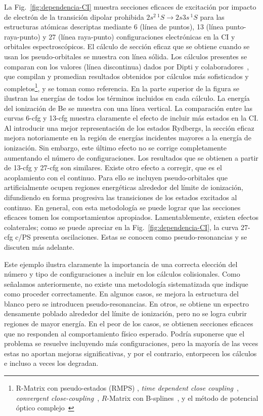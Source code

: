 La Fig.~\ref{fig:dependencia-CI} muestra secciones eficaces de 
excitación por impacto de electrón de la transición dipolar prohibida
$2s^2\,^1S\rightarrow 2s3s\,^1S$ para las estructuras atómicas 
descriptas mediante 6 (línea de puntos), 13 (línea punto-raya-punto) y 
27 (línea raya-punto) configuraciones electrónicas en la CI y 
orbitales espectroscópicos. El cálculo de sección eficaz que se obtiene 
cuando se usan los pseudo-orbitales se muestra con línea sólida. 
Los cálculos presentes se comparan con los valores (línea discontinua) 
dados por Dipti y colaboradores~\cite{Dipti:19}, que compilan y 
promedian resultados obtenidos por cálculos más sofisticados y 
completos\footnote{R-Matrix con pseudo-estados (RMPS) 
\cite{Be_Ballance:03,Bartschat:97}, \textit{time dependent close 
coupling}~\cite{Colgan:03}, \textit{convergent 
close-coupling}~\cite{Fursa:97,Bray:15}, $R$-Matrix con 
B-splines~\cite{Zatsarinny:16}, y el método de potencial óptico 
complejo~\cite{Blanco:17}}, y se toman como referencia. 
En la parte superior de la figura se ilustran las energías de todos los 
términos incluidos en cada cálculo. La energía del ionización de Be se 
muestra con una línea vertical. 
La comparación entre las curvas 6-cfg y 13-cfg muestra claramente el 
efecto de incluir más estados en la CI. Al introducir una mejor 
representación de los estados Rydbergs, la sección eficaz mejora 
notoriamente en la región de energías incidentes mayores a la energía de 
ionización. Sin embargo, este último efecto no se corrige completamente
aumentando el número de configuraciones. Los resultados que se obtienen
a partir de 13-cfg y 27-cfg son similares. Existe otro efecto a corregir, 
que es el acoplamiento con el continuo. Para ello se incluyen 
pseudo-orbitales que artificialmente ocupen regiones energéticas 
alrededor del límite de ionización, difundiendo en forma progresiva las 
transiciones de los estados excitados al continuo. 
En general, con esta metodología se puede lograr que las secciones 
eficaces tomen los comportamientos apropiados. Lamentablemente, existen 
efectos colaterales; como se puede apreciar en la 
Fig.~\ref{fig:dependencia-CI}, la curva 27-cfg c/PS presenta 
oscilaciones. Estas se conocen como pseudo-resonancias y se discuten más 
adelante. 

Este ejemplo ilustra claramente la importancia de una correcta elección 
del número y tipo de configuraciones a incluir en los cálculos 
colisionales. 
Como señalamos anteriormente, no existe una metodología sistematizada 
que indique como proceder correctamente. En algunos casos, se mejora la 
estructura del blanco pero se introducen pseudo-resonancias. En otros, 
se obtiene un espectro densamente poblado alrededor del límite de 
ionización, pero no se logra cubrir regiones de mayor energía. En el 
peor de los casos, se obtienen secciones eficaces que no 
responden al comportamiento físico esperado. Podría suponerse que el 
problema se resuelve incluyendo más configuraciones, pero la mayoría de 
las veces estas no aportan mejoras significativas, y por el contrario, 
entorpecen los cálculos e incluso a veces los degradan. 

